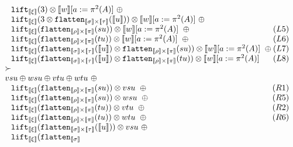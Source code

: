 \documentclass[a4paper,UKenglish,cleveref,autoref,numberwithinsect]{lipics-v2019}
\theoremstyle{definition}
\newcommand{\flatten}{\mathtt{flatten}}
\newcommand{\lift}{\mathtt{lift}}
\newcommand{\typeinterpret}[1]{\llbracket #1 \rrbracket}
\newcommand{\interpret}[1]{\llbracket #1 \rrbracket}
\begin{document}
\begin{itemize}
\[\begin{array}{l}
  \phantom{A}
    \lift_{\typeinterpret{\xi}}(3) \otimes \interpret{w}[a:=\pi^2(A)]
    \ \oplus \\
  \phantom{A}
    \lift_{\typeinterpret{\xi}}(3 \otimes
    \flatten_{\typeinterpret{\sigma} \times \typeinterpret{\tau}}(
    \interpret{u})) \otimes
    \interpret{w}[a:=\pi^2(A)]
    \ \oplus \\
  \phantom{A}
    \lift_{\typeinterpret{\xi}}(\flatten_{\typeinterpret{\rho} \times
    \typeinterpret{\pi}}(su)) \otimes
    \interpret{w}[a:=\pi^2(A)]
    \ \oplus \hfill (L5) \\
  \phantom{A}
    \lift_{\typeinterpret{\xi}}(\flatten_{\typeinterpret{\rho} \times
    \typeinterpret{\pi}}(tu)) \otimes
    \interpret{w}[a:=\pi^2(A)]
    \ \oplus \hfill (L6) \\
  \phantom{A}
    \lift_{\typeinterpret{\xi}}(\flatten_{\typeinterpret{\sigma} \times
    \typeinterpret{\tau}}(\interpret{u}) \otimes
    \flatten_{\typeinterpret{\rho} \times \typeinterpret{\pi}}(su))
    \otimes
    \interpret{w}[a:=\pi^2(A)]
    \ \oplus \hfill (L7) \\
  \phantom{A}
    \lift_{\typeinterpret{\xi}}(\flatten_{\typeinterpret{\sigma} \times
    \typeinterpret{\tau}}(\interpret{u}) \otimes
    \flatten_{\typeinterpret{\rho} \times \typeinterpret{\pi}}(tu))
    \otimes
    \interpret{w}[a:=\pi^2(A)] \hfill (L8) \\
  \succ \\
  vsu \oplus wsu \oplus
    vtu \oplus wtu\ \oplus \\
  \phantom{A}
    \lift_{\typeinterpret{\xi}}(\flatten_{\typeinterpret{\rho} \times
    \typeinterpret{\pi}}(su)) \otimes vsu\ \oplus
    \hfill (R1) \\
  \phantom{A}
    \lift_{\typeinterpret{\xi}}(\flatten_{\typeinterpret{\rho}
    \times \typeinterpret{\pi}}(su)) \otimes wsu\ \oplus
    \hfill (R5) \\
  \phantom{A}
    \lift_{\typeinterpret{\xi}}(\flatten_{\typeinterpret{\rho} \times
    \typeinterpret{\pi}}(tu)) \otimes vtu\ \oplus \hfill (R2) \\
  \phantom{A}
    \lift_{\typeinterpret{\xi}}(\flatten_{\typeinterpret{\rho}
    \times \typeinterpret{\pi}}(tu)) \otimes wtu\ \oplus
    \hfill (R6) \\
  \phantom{A}
    \lift_{\typeinterpret{\xi}}(\flatten_{\typeinterpret{\sigma}
    \times \typeinterpret{\tau}}(\interpret{u})) \otimes vsu\ \oplus \\
  \phantom{A}
    \lift_{\typeinterpret{\xi}}(\flatten_{\typeinterpret{\sigma}
}
\end{array}\]
\end{itemize}
\end{document}
